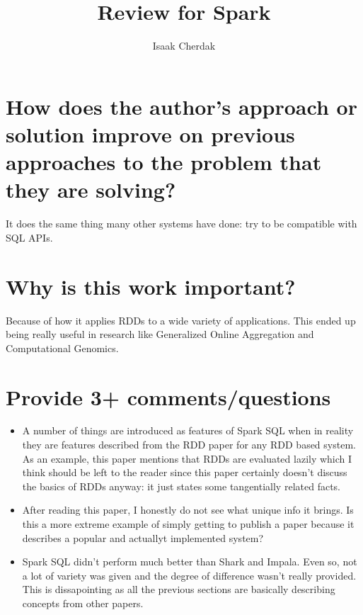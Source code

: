 \documentclass{article}
\title{Review for Spark}
\author{Isaak Cherdak}
\begin{document}
\maketitle

\section{How does the author's approach or solution improve on previous
approaches to the problem that they are solving?}

It does the same thing many other systems have done: try to be compatible with
SQL APIs.

\section{Why is this work important?}

Because of how it applies RDDs to a wide variety of applications. This ended up
being really useful in research like Generalized Online Aggregation and
Computational Genomics.

\section{Provide 3+ comments/questions}

\begin{itemize}
  \item A number of things are introduced as features of Spark SQL when in
    reality they are features described from the RDD paper for any RDD based
    system. As an example, this paper mentions that RDDs are evaluated lazily
    which I think should be left to the reader since this paper certainly
    doesn't discuss the basics of RDDs anyway: it just states some tangentially
    related facts.
  \item After reading this paper, I honestly do not see what unique info it
    brings. Is this a more extreme example of simply getting to publish a paper
    because it describes a popular and actuallyt implemented system?
  \item Spark SQL didn't perform much better than Shark and Impala. Even so, not
    a lot of variety was given and the degree of difference wasn't really
    provided. This is dissapointing as all the previous sections are basically
    describing concepts from other papers.
\end{itemize}
\end{document}
